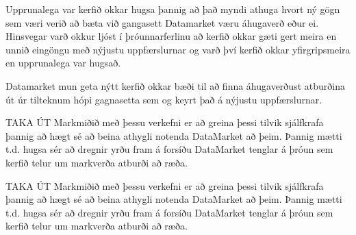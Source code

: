 \documentclass{article}
\begin{document}
Upprunalega var kerfið okkar hugsa þannig að það myndi athuga hvort ný gögn sem
væri verið að bæta við gangasett Datamarket væru áhugaverð eður ei. Hinsvegar
varð okkur ljóst í þróunnarferlinu að kerfið okkar gæti gert meira en unnið
eingöngu með nýjustu uppfærslurnar og varð því kerfið okkar yfirgripsmeira en
upprunalega var hugsað.

Datamarket mun geta nýtt kerfið okkar bæði til að finna áhugaverðust atburðina
út úr tilteknum hópi gagnasetta sem og keyrt það á nýjustu uppfærslurnar.

TAKA ÚT Markmiðið með þessu verkefni er að greina þessi tilvik sjálfkrafa þannig
að hægt sé að beina athygli notenda DataMarket að þeim. Þannig mætti t.d. hugsa
sér að dregnir yrðu fram á forsíðu DataMarket tenglar á þróun sem kerfið telur
um markverða atburði að ræða.


{
  \color{red}
TAKA ÚT Markmiðið með þessu verkefni er að greina þessi tilvik sjálfkrafa þannig
að hægt sé að beina athygli notenda DataMarket að þeim. Þannig mætti t.d. hugsa
sér að dregnir yrðu fram á forsíðu DataMarket tenglar á þróun sem kerfið telur
um markverða atburði að ræða.
}
\end{document}
